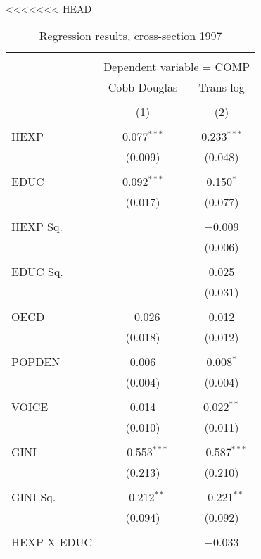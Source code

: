 \documentclass[12pt,a4paper]{article}\usepackage[]{graphicx}\usepackage[]{color}
\begin{document}
<<<<<<< HEAD
\begin{table}[!htbp] \centering 
  \caption{Regression results, cross-section 1997} 
  \label{tab:cs} 
\begin{tabular}{@{\extracolsep{5pt}}lcc} 
\\[-1.8ex]\hline 
\hline \\[-1.8ex] 
 & \multicolumn{2}{c}{Dependent variable = COMP} \\ 
\cline{2-3} 
 & Cobb-Douglas & Trans-log \\ 
\\[-1.8ex] & (1) & (2)\\ 
\hline \\[-1.8ex] 
 HEXP & 0.077$^{***}$ & 0.233$^{***}$ \\ 
  & (0.009) & (0.048) \\ 
  & & \\ 
 EDUC & 0.092$^{***}$ & 0.150$^{*}$ \\ 
  & (0.017) & (0.077) \\ 
  & & \\ 
 HEXP Sq. &  & $-$0.009 \\ 
  &  & (0.006) \\ 
  & & \\ 
 EDUC Sq. &  & 0.025 \\ 
  &  & (0.031) \\ 
  & & \\ 
 OECD & $-$0.026 & 0.012 \\ 
  & (0.018) & (0.012) \\ 
  & & \\ 
 POPDEN & 0.006 & 0.008$^{*}$ \\ 
  & (0.004) & (0.004) \\ 
  & & \\ 
 VOICE & 0.014 & 0.022$^{**}$ \\ 
  & (0.010) & (0.011) \\ 
  & & \\ 
 GINI & $-$0.553$^{***}$ & $-$0.587$^{***}$ \\ 
  & (0.213) & (0.210) \\ 
  & & \\ 
 GINI Sq. & $-$0.212$^{**}$ & $-$0.221$^{**}$ \\ 
  & (0.094) & (0.092) \\ 
  & & \\ 
 HEXP X EDUC &  & $-$0.033 \\ 

\end{tabular}
\end{table}
\end{document}
